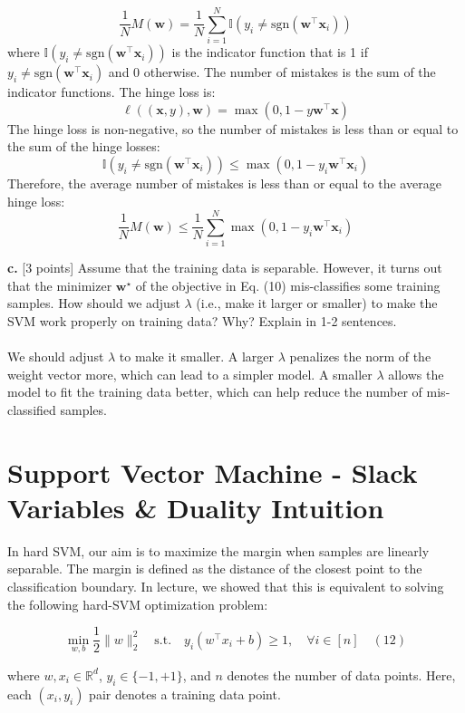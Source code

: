 \documentclass[a3paper,12pt]{extarticle} %
\begin{document}
\[
\frac{1}{N} M(\mathbf{w}) = \frac{1}{N} \sum_{i=1}^N \mathbb{I}(y_i \neq \text{sgn}(\mathbf{w}^\top \mathbf{x}_i))
\]
where \( \mathbb{I}(y_i \neq \text{sgn}(\mathbf{w}^\top \mathbf{x}_i)) \) is the indicator function that is 1 if \( y_i \neq \text{sgn}(\mathbf{w}^\top \mathbf{x}_i) \) and 0 otherwise. The number of mistakes is the sum of the indicator functions. The hinge loss is:
\[
\ell((\mathbf{x}, y), \mathbf{w}) = \max(0, 1 - y \mathbf{w}^\top \mathbf{x})
\]
The hinge loss is non-negative, so the number of mistakes is less than or equal to the sum of the hinge losses:
\[
\mathbb{I}(y_i \neq \text{sgn}(\mathbf{w}^\top \mathbf{x}_i)) \leq \max(0, 1 - y_i \mathbf{w}^\top \mathbf{x}_i)
\]
Therefore, the average number of mistakes is less than or equal to the average hinge loss:
\[
\frac{1}{N} M(\mathbf{w}) \leq \frac{1}{N} \sum_{i=1}^N \max \left( 0, 1 - y_i \mathbf{w}^\top \mathbf{x}_i \right)
\]


\noindent \textbf{c.} [3 points] Assume that the training data is separable. However, it turns out that the minimizer \( \mathbf{w}^\star \) of the objective in Eq. (10) mis-classifies some training samples. How should we adjust \( \lambda \) (i.e., make it larger or smaller) to make the SVM work properly on training data? Why? Explain in 1-2 sentences.
\\\\ We should adjust \( \lambda \) to make it smaller. A larger \( \lambda \) penalizes the norm of the weight vector more, which can lead to a simpler model. A smaller \( \lambda \) allows the model to fit the training data better, which can help reduce the number of mis-classified samples.\\

\newpage
\section{Support Vector Machine - Slack Variables \& Duality Intuition}

In hard SVM, our aim is to maximize the margin when samples are linearly separable. The margin is defined as the distance of the closest point to the classification boundary. In lecture, we showed that this is equivalent to solving the following hard-SVM optimization problem:

\[
\min_{w, b} \frac{1}{2} \|w\|_2^2 \quad \text{s.t.} \quad y_i(w^\top x_i + b) \geq 1, \quad \forall i \in [n] \quad (12)
\]

where \( w, x_i \in \mathbb{R}^d \), \( y_i \in \{-1, +1\} \), and \( n \) denotes the number of data points. Here, each \( (x_i, y_i) \) pair denotes a training data point.
\end{document}
